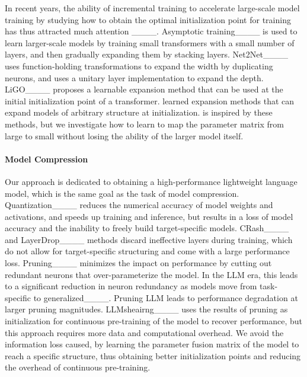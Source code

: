 In recent years, the ability of incremental training to accelerate large-scale model training by studying how to obtain the optimal initialization point for training has thus attracted much attention ____. Asymptotic training____ is used to learn larger-scale models by training small transformers with a small number of layers, and then gradually expanding them by stacking layers. Net2Net____ uses function-holding transformations to expand the width by duplicating neurons, and uses a unitary layer implementation to expand the depth. LiGO____ proposes a learnable expansion method that can be used at the initial initialization point of a transformer. learned expansion methods that can expand models of arbitrary structure at initialization. \aname is inspired by these methods, but we investigate how to learn to map the parameter matrix from large to small without losing the ability of the larger model itself.

\paragraph{Model Compression}
Our approach is dedicated to obtaining a high-performance lightweight language model, which is the same goal as the task of model compression. Quantization____ reduces the numerical accuracy of model weights and activations, and speeds up training and inference, but results in a loss of model accuracy and the inability to freely build target-specific models. CRash____ and LayerDrop____ methods discard ineffective layers during training, which do not allow for target-specific structuring and come with a large performance loss. Pruning____ minimizes the impact on performance by cutting out redundant neurons that over-parameterize the model. In the LLM era, this leads to a significant reduction in neuron redundancy as models move from task-specific to generalized____. Pruning LLM leads to performance degradation at larger pruning magnitudes. LLMsheairng____ uses the results of pruning as initialization for continuous pre-training of the model to recover performance, but this approach requires more data and computational overhead. We avoid the information loss caused, by learning the parameter fusion matrix of the model to reach a specific structure, thus obtaining better initialization points and reducing the overhead of continuous pre-training.

%